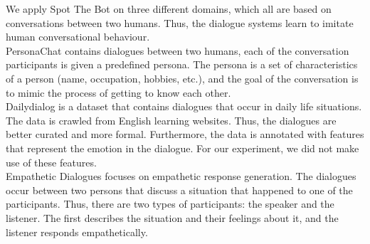 \documentclass[11pt,a4paper]{article}
\begin{document}
We apply Spot The Bot on three different domains, which all are based on conversations between two humans. Thus, the dialogue systems learn to imitate human conversational behaviour. \\
 PersonaChat \cite{zhang-etal-2018-personalizing} contains dialogues between two humans, each of the conversation participants is given a predefined persona. The persona is a set of characteristics of a person (name, occupation, hobbies, etc.), and the goal of the conversation is to mimic the process of getting to know each other. \\
 Dailydialog \cite{li-etal-2017-dailydialog} is a dataset that contains dialogues that occur in daily life situations. The data is crawled from English learning websites. Thus, the dialogues are better curated and more formal. Furthermore, the data is annotated with features that represent the emotion in the dialogue. For our experiment, we did not make use of these features. \\
 Empathetic Dialogues \cite{rashkin-etal-2019-towards} focuses on empathetic response generation. The dialogues occur between two persons that discuss a situation that happened to one of the participants. Thus, there are two types of participants: the speaker and the listener. The first describes the situation and their feelings about it, and the listener responds empathetically. 
\end{document}
